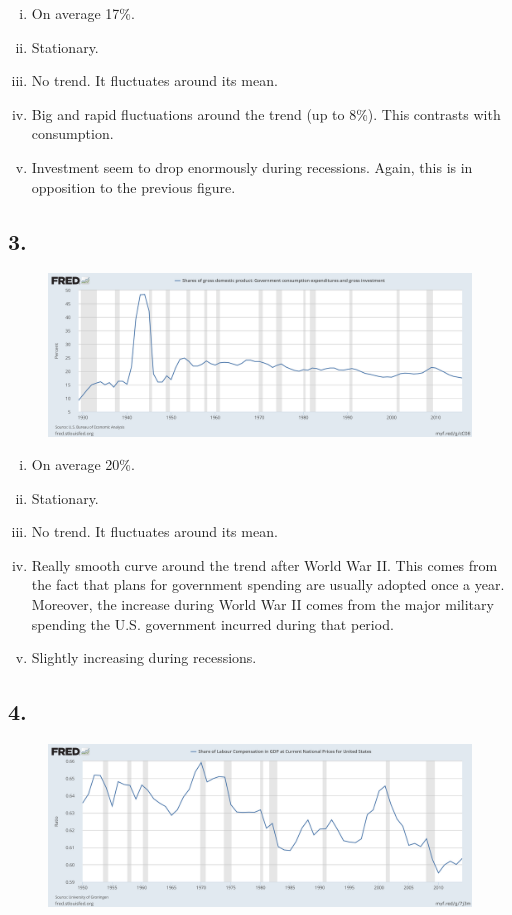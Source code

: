 \documentclass[12pt]{article}
\theoremstyle{definition}
\begin{document}
\begin{enumerate}[(i)]
	\item On average 17\%.
	\item Stationary.
	\item No trend. It fluctuates around its mean.
	\item Big and rapid fluctuations around the trend (up to 8\%). This contrasts with consumption.
	\item Investment seem to drop enormously during recessions. Again, this is in opposition to the previous figure.
\end{enumerate}

\subsection*{3.}
\begin{figure}[H]
	\centering
	\includegraphics[width=0.9\linewidth]{plot3}
	\label{fig:plot3}
\end{figure}

\begin{enumerate}[(i)]
	\item On average 20\%.
	\item Stationary.
	\item No trend. It fluctuates around its mean.
	\item Really smooth curve around the trend after World War II. This comes from the fact that plans for government spending are usually adopted once a year. Moreover, the increase during World War II comes from the major military spending the U.S. government incurred during that period.
	\item Slightly increasing during recessions.
\end{enumerate}

\subsection*{4.}
\begin{figure}[H]
	\centering
	\includegraphics[width=0.9\linewidth]{plot4}
	\label{fig:plot4}
\end{figure}
\end{document}
